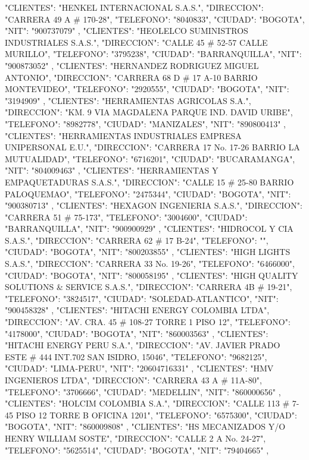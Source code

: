    {
   "CLIENTES": "HENKEL INTERNACIONAL S.A.S.",
   "DIRECCION": "CARRERA 49 A # 170-28",
   "TELEFONO": "8040833",
   "CIUDAD": "BOGOTA",
   "NIT": "900737079"
   },
   {
   "CLIENTES": "HEOLELCO SUMINISTROS INDUSTRIALES S.A.S.",
   "DIRECCION": "CALLE 45 # 52-57 CALLE MURILLO",
   "TELEFONO": "3795238",
   "CIUDAD": "BARRANQUILLA",
   "NIT": "900873052"
   },
   {
   "CLIENTES": "HERNANDEZ RODRIGUEZ MIGUEL ANTONIO",
   "DIRECCION": "CARRERA 68 D # 17 A-10 BARRIO MONTEVIDEO",
   "TELEFONO": "2920555",
   "CIUDAD": "BOGOTA",
   "NIT": "3194909"
   },
   {
   "CLIENTES": "HERRAMIENTAS AGRICOLAS S.A.",
   "DIRECCION": "KM. 9 VIA MAGDALENA PARQUE IND. DAVID URIBE",
   "TELEFONO": "8982778",
   "CIUDAD": "MANIZALES",
   "NIT": "890800413"
   },
   {
   "CLIENTES": "HERRAMIENTAS INDUSTRIALES EMPRESA UNIPERSONAL E.U.",
   "DIRECCION": "CARRERA 17 No. 17-26 BARRIO LA MUTUALIDAD",
   "TELEFONO": "6716201",
   "CIUDAD": "BUCARAMANGA",
   "NIT": "804009463"
   },
   {
   "CLIENTES": "HERRAMIENTAS Y EMPAQUETADURAS S.A.S.",
   "DIRECCION": "CALLE 15 # 25-80 BARRIO PALOQUEMAO",
   "TELEFONO": "2475344",
   "CIUDAD": "BOGOTA",
   "NIT": "900380713"
   },
   {
   "CLIENTES": "HEXAGON INGENIERIA S.A.S.",
   "DIRECCION": "CARRERA 51 # 75-173",
   "TELEFONO": "3004600",
   "CIUDAD": "BARRANQUILLA",
   "NIT": "900900929"
   },
   {
   "CLIENTES": "HIDROCOL Y CIA S.A.S.",
   "DIRECCION": "CARRERA 62 # 17 B-24",
   "TELEFONO": "",
   "CIUDAD": "BOGOTA",
   "NIT": "800203855"
   },
   {
   "CLIENTES": "HIGH LIGHTS S.A.S.",
   "DIRECCION": "CARRERA 33 No. 19-26",
   "TELEFONO": "6466000",
   "CIUDAD": "BOGOTA",
   "NIT": "800058195"
   },
   {
   "CLIENTES": "HIGH QUALITY SOLUTIONS & SERVICE S.A.S.",
   "DIRECCION": "CARRERA 4B # 19-21",
   "TELEFONO": "3824517",
   "CIUDAD": "SOLEDAD-ATLANTICO",
   "NIT": "900458328"
   },
   {
   "CLIENTES": "HITACHI ENERGY COLOMBIA LTDA",
   "DIRECCION": "AV. CRA. 45 # 108-27 TORRE 1 PISO 12",
   "TELEFONO": "4178000",
   "CIUDAD": "BOGOTA",
   "NIT": "860003563"
   },
   {
   "CLIENTES": "HITACHI ENERGY PERU S.A.",
   "DIRECCION": "AV. JAVIER PRADO ESTE # 444 INT.702 SAN ISIDRO, 15046",
   "TELEFONO": "9682125",
   "CIUDAD": "LIMA-PERU",
   "NIT": "20604716331"
   },
   {
   "CLIENTES": "HMV INGENIEROS LTDA",
   "DIRECCION": "CARRERA 43 A # 11A-80",
   "TELEFONO": "3706666",
   "CIUDAD": "MEDELLIN",
   "NIT": "860000656"
   },
   {
   "CLIENTES": "HOLCIM COLOMBIA S.A.",
   "DIRECCION": "CALLE 113 # 7-45 PISO 12 TORRE B OFICINA 1201",
   "TELEFONO": "6575300",
   "CIUDAD": "BOGOTA",
   "NIT": "860009808"
   },
   {
   "CLIENTES": "HS MECANIZADOS Y/O HENRY WILLIAM SOSTE",
   "DIRECCION": "CALLE 2 A No. 24-27",
   "TELEFONO": "5625514",
   "CIUDAD": "BOGOTA",
   "NIT": "79404665"
   },

